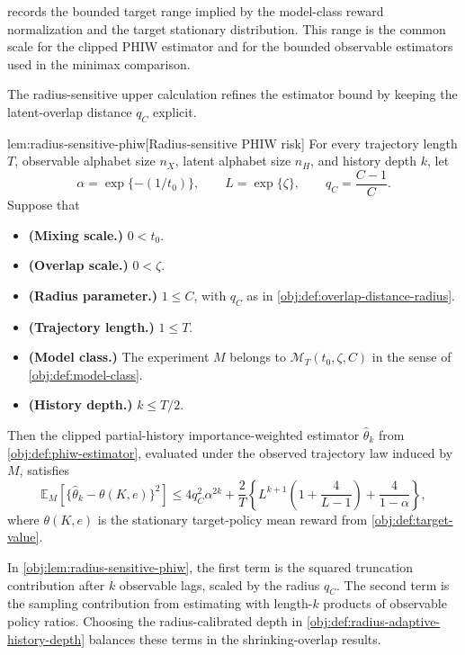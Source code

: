  records the bounded target range implied by the model-class reward normalization and the target stationary distribution. This range is the common scale for the clipped PHIW estimator and for the bounded observable estimators used in the minimax comparison.

The radius-sensitive upper calculation refines the estimator bound by keeping the latent-overlap distance \(q_C\) explicit.

\begin{lemmav}{lem:radius-sensitive-phiw}[Radius-sensitive PHIW risk]
For every trajectory length \(T\), observable alphabet size \(n_X\), latent alphabet size \(n_H\), and history depth \(k\), let
\[
\alpha=\exp\{-(1/t_0)\},\qquad L=\exp\{\zeta\},\qquad q_C=\frac{C-1}{C}.
\]
Suppose that
\begin{itemize}
\item \textbf{(Mixing scale.)} \(0<t_0\).
\item \textbf{(Overlap scale.)} \(0<\zeta\).
\item \textbf{(Radius parameter.)} \(1\le C\), with \(q_C\) as in \cref{obj:def:overlap-distance-radius}.
\item \textbf{(Trajectory length.)} \(1\le T\).
\item \textbf{(Model class.)} The experiment \(M\) belongs to \(\mathcal M_T(t_0,\zeta,C)\) in the sense of \cref{obj:def:model-class}.
\item \textbf{(History depth.)} \(k\le T/2\).
\end{itemize}
Then the clipped partial-history importance-weighted estimator \(\widehat\theta_k\) from \cref{obj:def:phiw-estimator}, evaluated under the observed trajectory law induced by \(M\), satisfies
\[
\mathbb E_M\!\left[\{\widehat\theta_k-\theta(K,e)\}^2\right]
\le
4q_C^2\alpha^{2k}
+\frac{2}{T}\left\{
L^{k+1}\left(1+\frac{4}{L-1}\right)
+\frac{4}{1-\alpha}
\right\},
\]
where \(\theta(K,e)\) is the stationary target-policy mean reward from \cref{obj:def:target-value}.
\end{lemmav}

In \cref{obj:lem:radius-sensitive-phiw}, the first term is the squared truncation contribution after \(k\) observable lags, scaled by the radius \(q_C\). The second term is the sampling contribution from estimating with length-\(k\) products of observable policy ratios. Choosing the radius-calibrated depth in \cref{obj:def:radius-adaptive-history-depth} balances these terms in the shrinking-overlap results.

